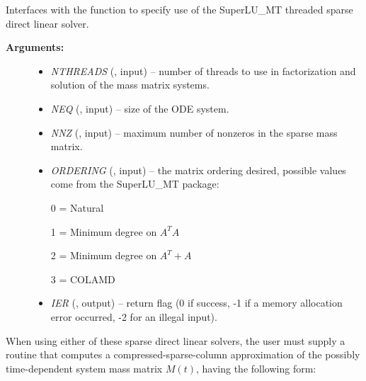\documentclass[letterpaper,10pt,english]{sphinxmanual}
\begin{document}
\begin{fulllineitems}
\label{f_interface/Usage:f/_/FARKMASSSUPERLUMT}
Interfaces with the {\hyperref[c_interface/User_callable:c.ARKMassSuperLUMT]{\emph{}}} function to
specify use of the SuperLU\_MT threaded sparse direct linear
solver.
\begin{description}
\item[{\textbf{Arguments:}}] \leavevmode\begin{itemize}
\item {} 
\emph{NTHREADS} (, input) -- number of threads to use in
factorization and solution of the mass matrix systems.

\item {} 
\emph{NEQ} (, input) -- size of the ODE system.

\item {} 
\emph{NNZ} (, input) -- maximum number of nonzeros in
the sparse mass matrix.

\item {} 
\emph{ORDERING} (, input) -- the matrix ordering desired,
possible values come from the SuperLU\_MT package:

0 = Natural

1 = Minimum degree on \(A^TA\)

2 = Minimum degree on \(A^T + A\)

3 = COLAMD

\item {} 
\emph{IER} (, output) -- return flag (0 if success, -1 if a
memory allocation error occurred, -2 for an illegal input).

\end{itemize}

\end{description}

\end{fulllineitems}


When using either of these sparse direct linear solvers, the user must
supply a routine that computes a compressed-sparse-column
approximation of the possibly time-dependent system mass matrix
\(M(t)\), having the following form:
\end{document}
